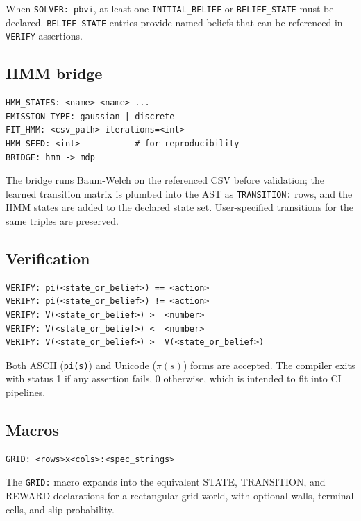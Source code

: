 \documentclass[conference]{IEEEtran}
\begin{document}
When \texttt{SOLVER: pbvi}, at least one
\texttt{INITIAL\_BELIEF} or \texttt{BELIEF\_STATE} must be
declared. \texttt{BELIEF\_STATE} entries provide named beliefs that
can be referenced in \texttt{VERIFY} assertions.

\subsection{HMM bridge}

\begin{lstlisting}[style=dsl]
HMM_STATES: <name> <name> ...
EMISSION_TYPE: gaussian | discrete
FIT_HMM: <csv_path> iterations=<int>
HMM_SEED: <int>           # for reproducibility
BRIDGE: hmm -> mdp
\end{lstlisting}

The bridge runs Baum-Welch on the referenced CSV before validation;
the learned transition matrix is plumbed into the AST as
\texttt{TRANSITION:} rows, and the HMM states are added to the
declared state set. User-specified transitions for the same triples
are preserved.

\subsection{Verification}

\begin{lstlisting}[style=dsl]
VERIFY: pi(<state_or_belief>) == <action>
VERIFY: pi(<state_or_belief>) != <action>
VERIFY: V(<state_or_belief>) >  <number>
VERIFY: V(<state_or_belief>) <  <number>
VERIFY: V(<state_or_belief>) >  V(<state_or_belief>)
\end{lstlisting}

Both ASCII (\texttt{pi(s)}) and Unicode ($\pi(s)$) forms are
accepted. The compiler exits with status 1 if any assertion fails,
0 otherwise, which is intended to fit into CI pipelines.

\subsection{Macros}

\begin{lstlisting}[style=dsl]
GRID: <rows>x<cols>:<spec_strings>
\end{lstlisting}

The \texttt{GRID:} macro expands into the equivalent STATE,
TRANSITION, and REWARD declarations for a rectangular grid world,
with optional walls, terminal cells, and slip probability.
\end{document}

